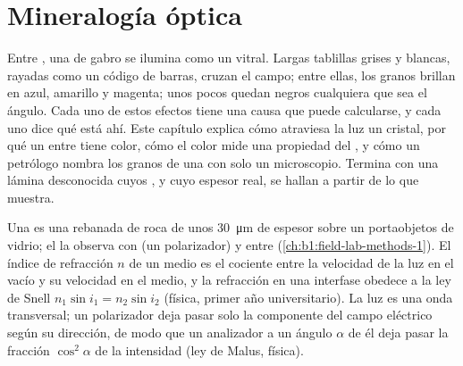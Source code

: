 \chapter{Mineralogía óptica}\label{ch:b1:optical-mineralogy}

Entre , una  de gabro se ilumina como un vitral. Largas tablillas grises y
blancas, rayadas como un código de barras, cruzan el campo; entre ellas, los granos brillan en azul, amarillo
y magenta; unos pocos quedan negros cualquiera que sea el ángulo. Cada uno de estos efectos tiene una causa
que puede calcularse, y cada uno dice qué  está ahí. Este capítulo explica cómo atraviesa la luz un
cristal, por qué un  entre  tiene color, cómo el color mide una propiedad del ,
y cómo un petrólogo nombra los granos de una  con solo un microscopio. Termina con una lámina
desconocida cuyos , y cuyo espesor real, se hallan a partir de lo que muestra.

\begin{recall}
Una  es una rebanada de roca de unos \qty{30}{\micro m} de espesor sobre un portaobjetos de
vidrio; el  la observa con  (un polarizador) y entre  (\cref{ch:b1:field-lab-methods-1}). El índice de refracción $n$ de un medio es el cociente entre la
velocidad de la luz en el vacío y su velocidad en el medio, y la refracción en una interfase obedece a la ley de
Snell $n_1\sin i_1 = n_2\sin i_2$ (física, primer año universitario). La luz es una onda transversal; un
polarizador deja pasar solo la componente del campo eléctrico según su dirección, de modo que un analizador a un
ángulo $\alpha$ de él deja pasar la fracción $\cos^2\alpha$ de la intensidad (ley de Malus, física).
\end{recall}

